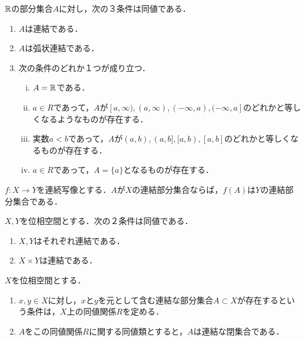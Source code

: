 \documentclass[uplatex,dvipdfmx]{jsreport}
\begin{document}
\begin{proposition}[$\R$の連結集合]
    $\R$の部分集合$A$に対し，次の３条件は同値である．
    \begin{enumerate}
        \item $A$は連結である．
        \item $A$は弧状連結である．
        \item 次の条件のどれか１つが成り立つ．
        \begin{enumerate}[(i)]
            \item $A=\mathbb{R}$である．
            \item $a\in R$であって，$A$が$[a,\infty),(a,\infty),(-\infty,a),(-\infty,a]$のどれかと等しくなるようなものが存在する．
            \item 実数$a<b$であって，$A$が$(a,b),(a,b],[a,b),[a,b]$のどれかと等しくなるものが存在する．
            \item $a\in R$であって，$A=\{a\}$となるものが存在する．
        \end{enumerate}
    \end{enumerate}
\end{proposition}

\begin{proposition}
    $f:X\to Y$を連続写像とする．$A$が$X$の連結部分集合ならば，$f(A)$は$Y$の連結部分集合である．
\end{proposition}

\begin{proposition}
    $X,Y$を位相空間とする．次の２条件は同値である．
    \begin{enumerate}
        \item $X,Y$はそれぞれ連結である．
        \item $X\times Y$は連結である．
    \end{enumerate}
\end{proposition}

\begin{proposition}[連結性だけからここまで言えてしまう]\label{prop-connected-component}
    $X$を位相空間とする．
    \begin{enumerate}
        \item $x,y\in X$に対し，$x$と$y$を元として含む連結な部分集合$A\subset X$が存在するという条件は，$X$上の同値関係$R$を定める．
        \item $A$をこの同値関係$R$に関する同値類とすると，$A$は連結な閉集合である．
    \end{enumerate}
\end{proposition}
\end{document}
